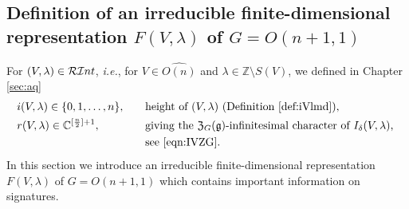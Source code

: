 \subsection{Definition of an irreducible finite-dimensional
\\
 representation $F(V,\lambda)$ of $G=O(n+1,1)$
\label{sec:FVlmd}}
For $(V,\lambda)\in {\mathcal{RI}}nt$, 
 {\it{i.e.}}, 
  for $V \in \widehat {O(n)}$
 and $\lambda \in {\mathbb{Z}} \setminus S(V)$, 
 we defined in Chapter \ref{sec:aq}
\begin{alignat*}{2}
& i(V,\lambda) \in \{0,1,\ldots,n\}, 
\quad
&&\text{height of $(V,\lambda)$
 (Definition \ref{def:iVlmd})}, 
\\
& r(V,\lambda) \in {\mathbb{C}}^{[\frac n 2]+1}, 
&&\text{giving the ${\mathfrak{Z}}_G({\mathfrak{g}})$-infinitesimal character 
 of $I_{\delta}(V,\lambda)$, }
\\
&
&&\text{see \eqref{eqn:IVZG}.}
\end{alignat*}
In this section 
 we introduce an irreducible finite-dimensional representation
 $F(V,\lambda)$ of $G=O(n+1,1)$
 which contains important information
 on signatures.  

